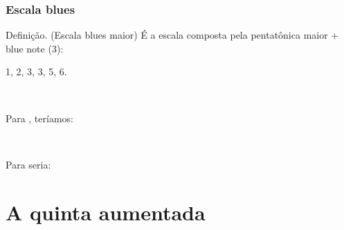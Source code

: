 \documentclass[usenames,dvipsnames]{beamer}
\newcommand\srbc[1]{{\footnotesize\rbc{#1}}}
\begin{document}
\begin{frame}[fragile]
  \frametitle{Escala blues}

  \begin{block}{Definição. (Escala blues maior)}
    É a escala composta pela pentatônica maior + blue note (3\srbc{\b}):
    \begin{center}
      1, 2, 3\srbc{\b}, 3, 5, 6.
    \end{center}
  \end{block}~\\
  \pause

  Para , teríamos:\\

  \begin{center}
  \end{center}~\\
  \pause

  Para  seria:\\

  \begin{center}
  \end{center}
\end{frame}

\section{A quinta aumentada}
\end{document}
